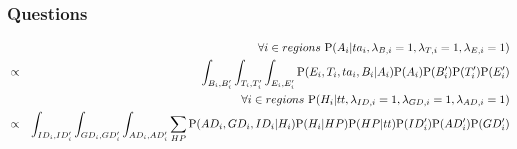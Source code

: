 \subsubsection{Questions}
\begin{footnotesize}
\begin{eqnarray*}
&  & \forall i \in regions\ \PP(A_i|ta_i,\lambda_{B,i}=1,\lambda_{T,i}=1,\lambda_{E,i}=1)\\
& \propto & \int_{B_i,B_i'} \int_{T_i,T_i'} \int_{E_i,E_i'} \PP(E_i,T_i,ta_i,B_i|A_i)\PP(A_i)\PP(B_i')\PP(T_i')\PP(E_i')\\
& & \forall i \in regions\ \PP(H_i|tt,\lambda_{ID,i}=1,\lambda_{GD,i}=1,\lambda_{AD,i}=1)\\
& \propto & \int_{ID_i,ID_i'}\int_{GD_i,GD_i'}\int_{AD_i,AD_i'}\sum_{HP}\PP(AD_i,GD_i,ID_i|H_i)\PP(H_i|HP)\PP(HP|tt)\PP(ID_i')\PP(AD_i')\PP(GD_i')
\end{eqnarray*}
\end{footnotesize}

